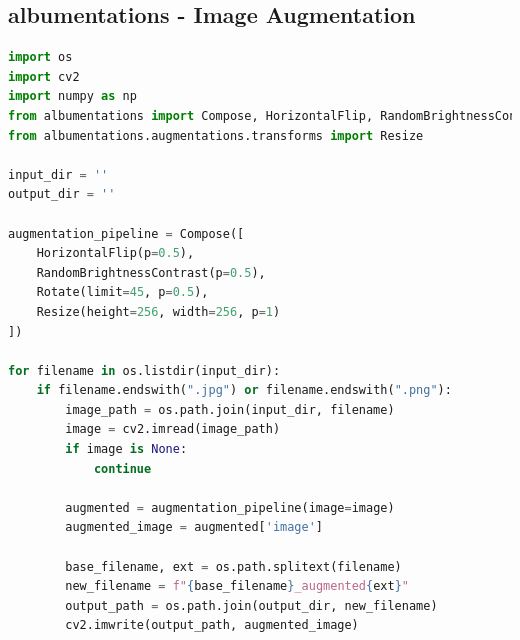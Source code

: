 \newpage

\subsection{albumentations - Image Augmentation}
\begin{lstlisting}[language=Python]
import os
import cv2
import numpy as np
from albumentations import Compose, HorizontalFlip, RandomBrightnessContrast, Rotate
from albumentations.augmentations.transforms import Resize

input_dir = ''
output_dir = ''

augmentation_pipeline = Compose([
    HorizontalFlip(p=0.5),
    RandomBrightnessContrast(p=0.5),
    Rotate(limit=45, p=0.5),
    Resize(height=256, width=256, p=1)
])

for filename in os.listdir(input_dir):
    if filename.endswith(".jpg") or filename.endswith(".png"):
        image_path = os.path.join(input_dir, filename)
        image = cv2.imread(image_path)
        if image is None:
            continue

        augmented = augmentation_pipeline(image=image)
        augmented_image = augmented['image']

        base_filename, ext = os.path.splitext(filename)
        new_filename = f"{base_filename}_augmented{ext}"
        output_path = os.path.join(output_dir, new_filename)
        cv2.imwrite(output_path, augmented_image)
\end{lstlisting}

\newpage